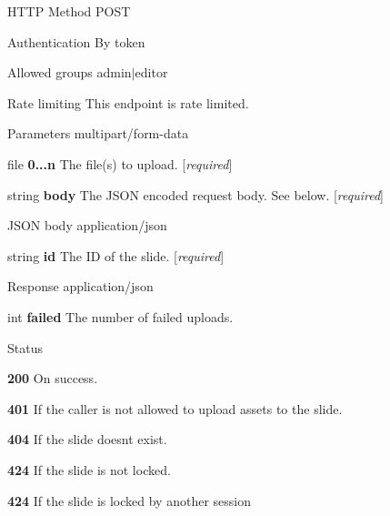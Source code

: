 \begin{DoxyParagraph}{H\+T\+TP Method}
P\+O\+ST 
\end{DoxyParagraph}
\begin{DoxyParagraph}{Authentication}
By token 
\end{DoxyParagraph}
\begin{DoxyParagraph}{Allowed groups}
{\ttfamily admin$\vert$editor} 
\end{DoxyParagraph}
\begin{DoxyParagraph}{Rate limiting}
This endpoint is rate limited.
\end{DoxyParagraph}
\begin{DoxyParagraph}{Parameters}
multipart/form-\/data
\begin{DoxyItemize}
\item {\ttfamily file} {\bfseries 0...n} The file(s) to upload. \mbox{[}{\itshape required}\mbox{]}
\item {\ttfamily string} {\bfseries body} The J\+S\+ON encoded request body. See below. \mbox{[}{\itshape required}\mbox{]}
\end{DoxyItemize}
\end{DoxyParagraph}
\begin{DoxyParagraph}{J\+S\+ON body}
application/json
\begin{DoxyItemize}
\item {\ttfamily string} {\bfseries id} The ID of the slide. \mbox{[}{\itshape required}\mbox{]}
\end{DoxyItemize}
\end{DoxyParagraph}
\begin{DoxyParagraph}{Response}
application/json
\begin{DoxyItemize}
\item {\ttfamily int} {\bfseries failed} The number of failed uploads.
\end{DoxyItemize}
\end{DoxyParagraph}
\begin{DoxyParagraph}{Status}

\begin{DoxyItemize}
\item {\bfseries 200} On success.
\item {\bfseries 401} If the caller is not allowed to upload assets to the slide.
\item {\bfseries 404} If the slide doesn\textquotesingle{}t exist.
\item {\bfseries 424} If the slide is not locked.
\item {\bfseries 424} If the slide is locked by another session 
\end{DoxyItemize}
\end{DoxyParagraph}
